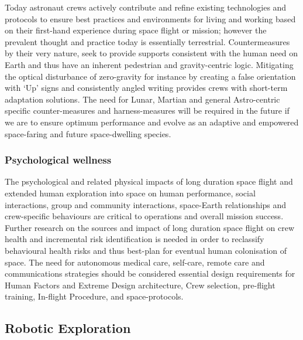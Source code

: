 \documentclass[letter,11pt]{article}
\begin{document}
Today astronaut crews actively contribute and refine existing technologies and
protocols to ensure best practices and environments for living and working
based on their first-hand experience during space flight or mission; however
the prevalent thought and practice today is essentially terrestrial.
Countermeasures by their very nature, seek to provide supports consistent with
the human need on Earth and thus have an inherent pedestrian and
gravity-centric logic. Mitigating the optical disturbance of zero-gravity for
instance by creating a false orientation with `Up' signs and consistently
angled writing provides crews with short-term adaptation solutions. The need
for Lunar, Martian and general Astro-centric specific counter-measures and
harness-measures will be required in the future if we are to ensure optimum
performance and evolve as an adaptive and empowered space-faring and future
space-dwelling species.

 
\subsubsection*{Psychological wellness}

The psychological and related physical impacts of long duration space flight
and extended human exploration into space on human performance, social
interactions, group and community interactions, space-Earth relationships and
crew-specific behaviours are critical to operations and overall mission
success. Further research on the sources and impact of long duration space
flight on crew health and incremental risk identification is needed in order to
reclassify behavioural health risks and thus best-plan for eventual human
colonisation of space. The need for autonomous medical care, self-care, remote
care and communications strategies should be considered essential design
requirements for Human Factors and Extreme Design architecture, Crew selection,
pre-flight training, In-flight Procedure, and space-protocols.  

\subsection{Robotic Exploration}
\end{document}
